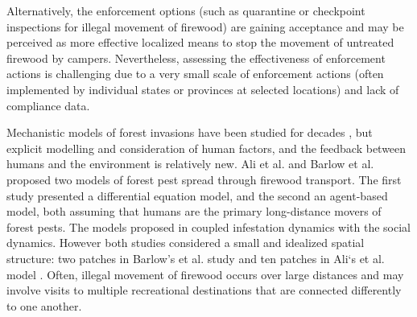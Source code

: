Alternatively, the enforcement options (such as quarantine or checkpoint inspections for illegal movement of firewood) are gaining acceptance and may be perceived as more effective localized means to stop the movement of untreated firewood by campers. Nevertheless, assessing the effectiveness of enforcement actions is challenging due to a very small scale of enforcement actions (often implemented by individual states or provinces at selected locations) and lack of compliance data. 

Mechanistic models of forest invasions have been studied for decades \cite{tegner1981population,ludwig1978qualitative}, but explicit modelling and consideration of human factors, and the feedback between humans and the environment is relatively new. Ali et al. and Barlow et al. \cite{barlow2014modelling,ali2015coupled} proposed two models of forest pest spread through firewood transport.  The first study presented a differential equation model, and the second an agent-based model, both assuming that humans are the primary long-distance movers of forest pests. The models proposed in \cite{barlow2014modelling,ali2015coupled} coupled infestation dynamics with the social dynamics. However both studies considered a small and idealized spatial structure: two patches in Barlow's et al. \cite{barlow2014modelling} study and ten patches in Ali‘s et al. model \cite{ali2015coupled}. Often, illegal movement of firewood occurs over large distances and may involve visits to multiple recreational destinations that are connected differently to one another. 


